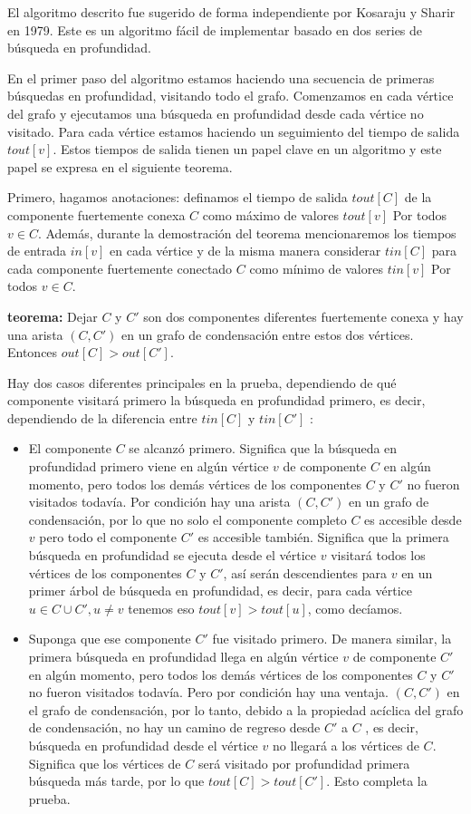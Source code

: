 El algoritmo descrito fue sugerido de forma independiente por Kosaraju y Sharir en 1979. Este es un algoritmo fácil de implementar basado en dos series de búsqueda en profundidad.

En el primer paso del algoritmo estamos haciendo una secuencia de primeras búsquedas en profundidad, visitando todo el grafo. Comenzamos en cada vértice del grafo y ejecutamos una búsqueda en profundidad desde cada vértice no visitado. Para cada vértice estamos haciendo un seguimiento del tiempo de salida $tout[v]$. Estos tiempos de salida tienen un papel clave en un algoritmo y este papel se expresa en el siguiente teorema.

Primero, hagamos anotaciones: definamos el tiempo de salida $tout[C]$ de la componente fuertemente conexa $C$ como máximo de valores $tout[v]$ Por todos $v \in C$. Además, durante la demostración del teorema mencionaremos los tiempos de entrada $in[v]$ en cada vértice y de la misma manera considerar $tin[C]$ para cada componente fuertemente conectado $C$ como mínimo de valores $tin[v]$ Por todos $v \in C$.

\textbf{teorema:} Dejar $C$ y $C'$ son dos componentes diferentes fuertemente conexa y hay una arista $(C, C')$ en un grafo de condensación entre estos dos vértices. Entonces $out[C] > out[C']$.

Hay dos casos diferentes principales en la prueba, dependiendo de qué componente visitará primero la 
búsqueda en profundidad primero, es decir, dependiendo de la diferencia entre $tin[C]$ y $tin[C']$ :

\begin{itemize}
	\item El componente $C$ se alcanzó primero. Significa que la búsqueda en profundidad primero viene 
	en algún vértice $v$ de componente $C$ en algún momento, pero todos los demás vértices de los 
	componentes $C$ y $C'$ no fueron visitados todavía. Por condición hay una arista $(C, C')$ en un 
	grafo de condensación, por lo que no solo el componente completo $C$ es accesible desde $v$ pero 
	todo el componente $C'$ es accesible también. Significa que la primera búsqueda en profundidad se 
	ejecuta desde el vértice $v$ visitará todos los vértices de los componentes $C$ y $C'$, así serán 
	descendientes para $v$ en un primer árbol de búsqueda en profundidad, es decir, para cada vértice $u \in C \cup C', u \ne v$ tenemos eso $tout[v] > tout[u]$, como decíamos.
	
	\item Suponga que ese componente $C'$ fue visitado primero. De manera similar, la primera búsqueda 
	en profundidad llega en algún vértice $v$ de componente $C'$ en algún momento, pero todos los demás 
	vértices de los componentes $C$ y $C'$ no fueron visitados todavía. Pero por condición hay una 
	ventaja. $(C, C')$ en el grafo de condensación, por lo tanto, debido a la propiedad acíclica del 
	grafo de condensación, no hay un camino de regreso desde $C'$ a $C$ , es decir, búsqueda en 
	profundidad desde el vértice $v$ no llegará a los vértices de $C$. Significa que los vértices de $C$ será visitado por profundidad primera búsqueda más tarde, por lo que $tout[C] > tout[C']$. Esto completa la prueba.
\end{itemize}

